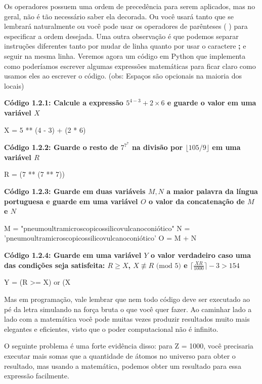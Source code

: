 \documentclass[11pt, a4paper]{article}
\begin{document}
Os operadores possuem uma ordem de precedência para serem aplicados, mas no geral, não é tão necessário saber ela decorada. Ou você usará tanto que se lembrará naturalmente ou você pode usar os operadores de parênteses ( ) para especificar a ordem desejada. Uma outra observação é que podemos separar instruções diferentes tanto por mudar de linha quanto por usar o caractere \textbf{;} e seguir na mesma linha. Veremos agora um código em Python que implementa como poderíamos escrever algumas expressões matemáticas para ficar claro como usamos eles ao escrever o código. (obs: Espaços são opcionais na maioria dos locais)

\textbf{Código 1.2.1: Calcule a expressão \(5^{4-3}+2 \times 6\) e guarde o valor em uma variável \(X\)}

\begin{code}
X = 5 ** (4 - 3) + (2 * 6)
\end{code}

\textbf{Código 1.2.2: Guarde o resto de \(7^{7^{7}}\) na divisão por \(\lfloor105/9\rfloor\) em uma variável \(R\)}

\begin{code}
R = (7 ** (7 ** 7)) %
\end{code}

\textbf{Código 1.2.3: Guarde em duas variáveis \(M,N\) a maior palavra da língua portuguesa e guarde em uma variável \(O\) o valor da concatenação de \(M\) e \(N\)}

\begin{code}
M = "pneumoultramicroscopicossilicovulcanoconiótico"
N = 'pneumoultramicroscopicossilicovulcanoconiótico'
O = M + N
\end{code}

\textbf{Código 1.2.4: Guarde em uma variável \(Y\) o valor verdadeiro caso uma das condições seja satisfeita: \(R \geq X\), \(X \not\equiv R \text{ (mod 5)} \) e \(\lceil\frac{XR}{1000}\rceil-3>154\)}

\begin{code}
Y = (R >= X) or (X%
\end{code}

Mas em programação, vale lembrar que nem todo código deve ser executado ao pé da letra simulando na força bruta o que você quer fazer. Ao caminhar lado a lado com a matemática você pode muitas vezes produzir resultados muito mais elegantes e eficientes, visto que o poder computacional não é infinito. 

O seguinte problema é uma forte evidência disso: para Z = 1000, você precisaria executar mais somas que a quantidade de átomos no universo para obter o resultado, mas usando a matemática, podemos obter um resultado para essa expressão facilmente.
\end{document}
